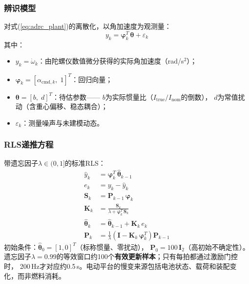\subsubsection{辨识模型}

对式(\ref{eq:adrc_plant})的离散化，以角加速度为观测量：
\begin{equation}
    y_k = \boldsymbol{\varphi}_k^T\,\boldsymbol{\theta} + \varepsilon_k
    \label{eq:rls_model}
\end{equation}
其中：
\begin{itemize}
    \item $y_k = \dot\omega_k$：由陀螺仪数值微分获得的实际角加速度（rad/s$^2$）；
    \item $\boldsymbol{\varphi}_k = [\alpha_{\mathrm{cmd},k},\;1]^T$：回归向量；
    \item $\boldsymbol{\theta} = [b,\;d]^T$：待估参数——
          $b$为实际惯量比（$I_{\mathrm{true}}/I_{\mathrm{nom}}$的倒数），
          $d$为常值扰动（含重心偏移、稳态耦合）；
    \item $\varepsilon_k$：测量噪声与未建模动态。
\end{itemize}

\subsubsection{RLS递推方程}

带遗忘因子$\lambda\in(0,1]$的标准RLS\cite{astrom1995adaptive,ljung1999system}：
\begin{equation}
    \boxed{
    \begin{aligned}
        \hat{y}_k &= \boldsymbol{\varphi}_k^T\,\hat{\boldsymbol{\theta}}_{k-1} \\
        e_k &= y_k - \hat{y}_k \\
        \mathbf{S}_k &= \mathbf{P}_{k-1}\,\boldsymbol{\varphi}_k \\
        \mathbf{K}_k &= \frac{\mathbf{S}_k}{\lambda + \boldsymbol{\varphi}_k^T\,\mathbf{S}_k} \\
        \hat{\boldsymbol{\theta}}_k &= \hat{\boldsymbol{\theta}}_{k-1}
            + \mathbf{K}_k\,e_k \\
        \mathbf{P}_k &= \frac{1}{\lambda}
            \left(\mathbf{I} - \mathbf{K}_k\,\boldsymbol{\varphi}_k^T\right)
            \mathbf{P}_{k-1}
    \end{aligned}
    }
    \label{eq:rls_update}
\end{equation}
初始条件：$\hat{\boldsymbol{\theta}}_0=[1,0]^T$（标称惯量、零扰动），
$\mathbf{P}_0=100\,\mathbf{I}_2$（高初始不确定性）。
遗忘因子$\lambda=0.99$的等效窗口约100个\textbf{有效更新样本}；只有每拍都通过激励门控时，
200\,Hz才对应约0.5\,s。电动平台的慢变来源包括电池状态、载荷和装配变化，而非燃料消耗。

